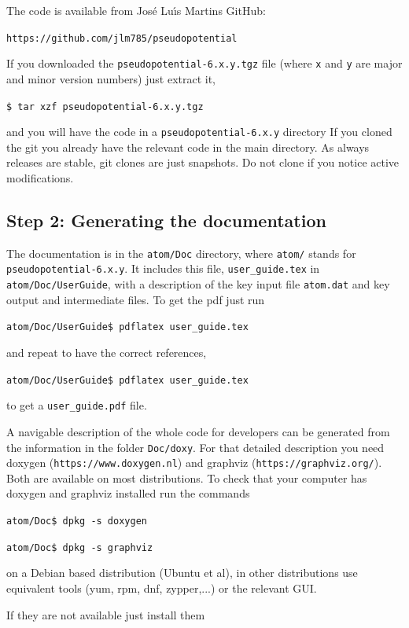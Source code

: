 \documentclass[11pt]{article}
\begin{document}
The code is available from Jos\'e Lu\'{\i}s Martins GitHub:

\noindent\texttt{https://github.com/jlm785/pseudopotential}

If you downloaded the \texttt{pseudopotential-6.x.y.tgz} file (where \texttt{x} and \texttt{y}
are major and minor version numbers) just extract it,

\noindent\texttt{\$ tar xzf pseudopotential-6.x.y.tgz}

and you will have the code in a \texttt{pseudopotential-6.x.y} directory
If you cloned the git you already have the relevant code in the main directory.
As always releases are stable, git clones are just snapshots.  Do not clone
if you notice active modifications.

\subsection{Step 2: Generating the documentation}
\label{sec:step2}

The documentation is in the \texttt{atom/Doc} directory, where \texttt{atom/}
stands for \texttt{pseudopotential-6.x.y}.
It includes this file, \texttt{user\_guide.tex} in \texttt{atom/Doc/UserGuide}, with a description of the key input file
\texttt{atom.dat} and key output and intermediate files.
To get the pdf just run

\noindent\texttt{atom/Doc/UserGuide\$ pdflatex user\_guide.tex}

and repeat to have the correct references,

\noindent\texttt{atom/Doc/UserGuide\$ pdflatex user\_guide.tex}

to get a \texttt{user\_guide.pdf} file.

A navigable description of the whole code for developers
can be generated from the information in the folder \texttt{Doc/doxy}.
For that detailed description you need doxygen (\texttt{https://www.doxygen.nl}) and
graphviz (\texttt{https://graphviz.org/}).  Both are
available on most distributions.  To check that your computer has doxygen and graphviz installed
run the commands

\noindent\texttt{atom/Doc\$ dpkg -s doxygen}

\noindent\texttt{atom/Doc\$ dpkg -s graphviz}

on a Debian based distribution (Ubuntu et al), in other distributions
use equivalent tools (yum, rpm, dnf, zypper,...) or the relevant GUI.

If they are not available just install them
\end{document}
